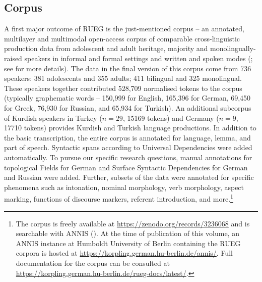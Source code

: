 \documentclass[output=paper,colorlinks,citecolor=brown]{langscibook}
\begin{document}
\subsection{Corpus} \label{sec:introwieseetal:corpus}

A first major outcome of RUEG is the just-mentioned corpus – an annotated, multilayer and multimodal open-access corpus of comparable cross-linguistic production data from adolescent and adult heritage, majority and monolingually-raised speakers in informal and formal settings and written and spoken modes (\citealt{RUEGcorpus2019}; see \cite{chapters/03} for more details).
The data in the final version of this corpus come from 736 speakers: 381 adolescents and 355 adults; 411 bilingual and 325 monolingual. These speakers together contributed 528,709 normalised tokens to the corpus (typically graphematic words – 150,999 for English, 165,396 for German, 69,450 for Greek, 76,930 for Russian, and 65,934 for Turkish). An additional subcorpus of Kurdish speakers in Turkey ($n=29$, 15169 tokens) and Germany ($n=9$, 17710 tokens) provides Kurdish and Turkish language productions.
In addition to the basic transcription, the entire corpus is annotated for language, lemma, and part of speech. Syntactic spans according to Universal Dependencies were added automatically. To pursue our specific research questions, manual annotations for topological Fields for German and Surface Syntactic Dependencies for German and Russian were added. Further, subsets of the data were annotated for specific phenomena such as intonation, nominal morphology, verb morphology, aspect marking, functions of discourse markers, referent introduction, and more.{\footnote{The corpus is freely available at \url{https://zenodo.org/records/3236068} and is searchable with ANNIS (\citealt{KrauseZeldes2016,KrauseEtAl2023}). At the time of publication of this volume, an ANNIS instance at Humboldt University of Berlin containing the RUEG corpora is hosted at \url{https://korpling.german.hu-berlin.de/annis/}. Full documentation for the corpus can be consulted at \url{https://korpling.german.hu-berlin.de/rueg-docs/latest/}.}}
\end{document}
